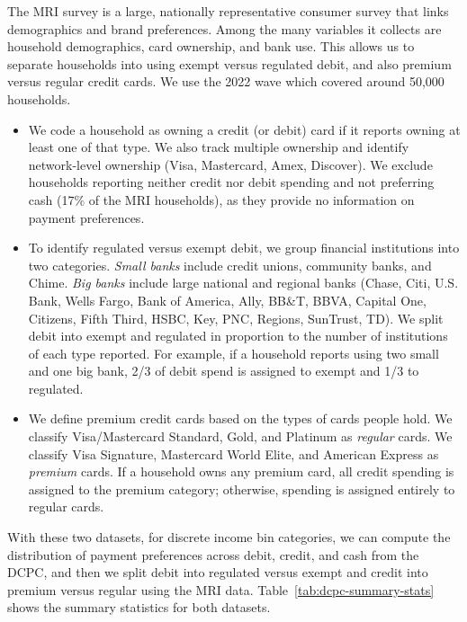 \documentclass[main.tex]{subfiles}
\begin{document}
The MRI survey is a large, nationally representative consumer survey that links demographics and brand preferences.
Among the many variables it collects are household demographics, card ownership, and bank use.
This allows us to separate households into using exempt versus regulated debit, and also premium versus regular credit cards.
We use the 2022 wave which covered around 50,000 households.

\begin{itemize}
    \item We code a household as owning a credit (or debit) card if it reports owning at least one of that type. We also track multiple ownership and identify network-level ownership (Visa, Mastercard, Amex, Discover). We exclude households reporting neither credit nor debit spending and not preferring cash (17\% of the MRI households), as they provide no information on payment preferences.
    \item To identify regulated versus exempt debit, we group financial institutions into two categories. \emph{Small banks} include credit unions, community banks, and Chime. \emph{Big banks} include large national and regional banks (Chase, Citi, U.S. Bank, Wells Fargo, Bank of America, Ally, BB\&T, BBVA, Capital One, Citizens, Fifth Third, HSBC, Key, PNC, Regions, SunTrust, TD). We split debit into exempt and regulated in proportion to the number of institutions of each type reported. For example, if a household reports using two small and one big bank, 2/3 of debit spend is assigned to exempt and 1/3 to regulated.
    \item We define premium credit cards based on the types of cards people hold. We classify Visa/Mastercard Standard, Gold, and Platinum as \emph{regular} cards. We classify Visa Signature, Mastercard World Elite, and American Express as \emph{premium} cards. If a household owns any premium card, all credit spending is assigned to the premium category; otherwise, spending is assigned entirely to regular cards.
\end{itemize}

With these two datasets, for discrete income bin categories, we can compute the distribution of payment preferences across debit, credit, and cash from the DCPC, and then we split debit into regulated versus exempt and credit into premium versus regular using the MRI data.
Table~\ref{tab:dcpc-summary-stats} shows the summary statistics for both datasets.
\end{document}
